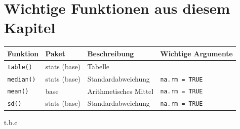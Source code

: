 \documentclass[
]{book}
\begin{document}
\hypertarget{wichtige-funktionen-aus-diesem-kapitel}{%
\section*{Wichtige Funktionen aus diesem Kapitel}\label{wichtige-funktionen-aus-diesem-kapitel}}

\begin{longtable}[]{@{}llll@{}}
\toprule
Funktion & Paket & Beschreibung & Wichtige Argumente\tabularnewline
\midrule
\endhead
\texttt{table()} & stats (base) & Tabelle &\tabularnewline
\texttt{median()} & stats (base) & Standardabweichung & \texttt{na.rm\ =\ TRUE}\tabularnewline
\texttt{mean()} & base & Arithmetisches Mittel & \texttt{na.rm\ =\ TRUE}\tabularnewline
\texttt{sd()} & stats (base) & Standardabweichung & \texttt{na.rm\ =\ TRUE}\tabularnewline
\bottomrule
\end{longtable}

t.b.c

  
\end{document}

